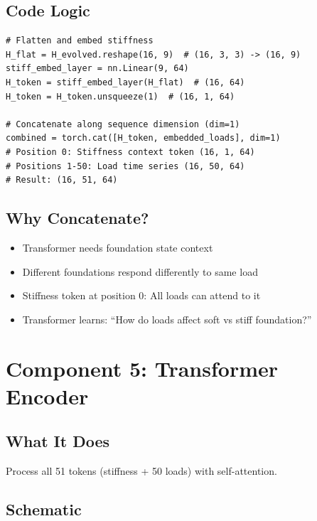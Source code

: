 \documentclass[11pt,a4paper]{article}
\begin{document}
\subsection{Code Logic}

\begin{lstlisting}[caption=Concatenation Process]
# Flatten and embed stiffness
H_flat = H_evolved.reshape(16, 9)  # (16, 3, 3) -> (16, 9)
stiff_embed_layer = nn.Linear(9, 64)
H_token = stiff_embed_layer(H_flat)  # (16, 64)
H_token = H_token.unsqueeze(1)  # (16, 1, 64)

# Concatenate along sequence dimension (dim=1)
combined = torch.cat([H_token, embedded_loads], dim=1)
# Position 0: Stiffness context token (16, 1, 64)
# Positions 1-50: Load time series (16, 50, 64)
# Result: (16, 51, 64)
\end{lstlisting}

\subsection{Why Concatenate?}

\begin{itemize}
  \item Transformer needs foundation state context
  \item Different foundations respond differently to same load
  \item Stiffness token at position 0: All loads can attend to it
  \item Transformer learns: ``How do loads affect soft vs stiff foundation?''
\end{itemize}

\section{Component 5: Transformer Encoder}

\subsection{What It Does}

Process all 51 tokens (stiffness + 50 loads) with self-attention.

\subsection{Schematic}
\end{document}
